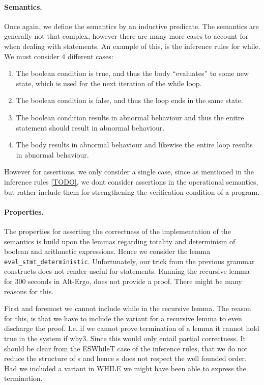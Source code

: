 \paragraph{Semantics.}
Once again, we define the semantics by an inductive predicate. The semantics are generally not that complex,
however there are many more cases to account for when dealing with statements.
An example of this, is the inference rules for while.
We must consider 4 different cases:

\begin{enumerate}
  \item The boolean condition is true, and thus the body ``evaluates'' to some new state, which is used for the next iteration of the while loop.
  \item The boolean condition is false, and thus the loop ends in the same state.
  \item The boolean condition results in abnormal behaviour and thus the enitre statement should result in abnormal behaviour.
  \item The body results in abnormal behaviour and likewise the entire loop results in abnormal behaviour.
\end{enumerate}

However for assertions, we only consider a single case, since as mentioned in the inference rules \autoref{TODO},
we dont consider assertions in the operational semantics, but rather include them for strengthening the
verification condition of a program.

\paragraph{Properties.}
The properties for asserting the correctness of the implementation of the semantics is build upon the lemmas regarding totality and determinism of boolean and arithmetic expressions. Hence we consider the lemma
\texttt{eval_stmt_deterministic}. Unfortunately, our trick from the previous grammar constructs does not render useful for statements. Running the recursive lemma for 300 seconds in Alt-Ergo, does not provide a proof.
There might be many reasons for this.

First and foremost we cannot include while in the recursive lemma. The reason for this, is that we have to
include the variant for a recursive lemma to even discharge the proof. I.e. if we cannot prove termination of a lemma it cannot hold true in the system if why3. Since this would only entail partial correctness.
It should be clear from the ESWhileT case of the inference rules, that we do not reduce the structure of s and hence s does not respect the well founded order.
Had we included a variant in WHILE we might have been able to express the termination.

